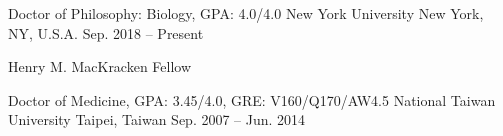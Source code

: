 

\begin{cventries}

  \cventry%
    {Doctor of Philosophy: Biology, GPA: 4.0/4.0}%
    {New York University}%
    {New York, NY, U.S.A.}%
    {Sep. 2018 -- Present}%
    {%
        \begin{cvitems} %
            \item{Henry M. MacKracken Fellow}%
        \end{cvitems}%
    }
    
  \cventry%
    {Doctor of Medicine, GPA: 3.45/4.0, GRE: V160/Q170/AW4.5 } %
    {National Taiwan University} %
    {Taipei, Taiwan} %
    {Sep. 2007 -- Jun. 2014} %
    {}

\end{cventries}

